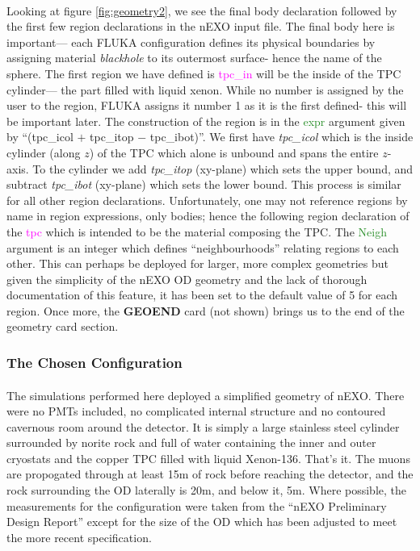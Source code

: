 \documentclass[10pt]{article}
\begin{document}
\paragraph{}
Looking at figure \ref{fig:geometry2}, we see the final body declaration followed by the first few region declarations in the nEXO input file. The final body here is important— each FLUKA configuration defines its physical boundaries by assigning material \textit{blackhole} to its outermost surface- hence the name of the sphere. The first region we have defined is \textcolor{magenta}{tpc\_in} will be the inside of the TPC cylinder— the part filled with liquid xenon. While no number is assigned by the user to the region, FLUKA assigns it number 1 as it is the first defined- this will be important later. The construction of the region is in the \textcolor{ForestGreen}{expr} argument given by ``(tpc\_icol $+$ tpc\_itop $-$ tpc\_ibot)''. We first have \textit{tpc\_icol} which is the inside cylinder (along $z$) of the TPC which alone is unbound and spans the entire $z$-axis. To the cylinder we add \textit{tpc\_itop} (xy-plane) which sets the upper bound, and subtract \textit{tpc\_ibot} (xy-plane) which sets the lower bound. This process is similar for all other region declarations. Unfortunately, one may not reference regions by name in region expressions, only bodies; hence the following region declaration of the \textcolor{magenta}{tpc} which is intended to be the material composing the TPC. The \textcolor{ForestGreen}{Neigh} argument is an integer which defines ``neighbourhoods'' relating regions to each other. This can perhaps be deployed for larger, more complex geometries but given the simplicity of the nEXO OD geometry and the lack of thorough documentation of this feature, it has been set to the default value of 5 for each region. Once more, the \textbf{GEOEND} card (not shown) brings us to the end of the geometry card section.

\subsubsection{The Chosen Configuration}
\paragraph{}
The simulations performed here deployed a simplified geometry of nEXO. There were no PMTs included, no complicated internal structure and no contoured cavernous room around the detector. It is simply a large stainless steel cylinder surrounded by norite rock and full of water containing the inner and outer cryostats and the copper TPC filled with liquid Xenon-136. That's it. The muons are propogated through at least 15m of rock before reaching the detector, and the rock surrounding the OD laterally is 20m, and below it, 5m. Where possible, the measurements for the configuration were taken from the ``nEXO Preliminary Design Report'' except for the size of the OD which has been adjusted to meet the more recent specification.
\end{document}
